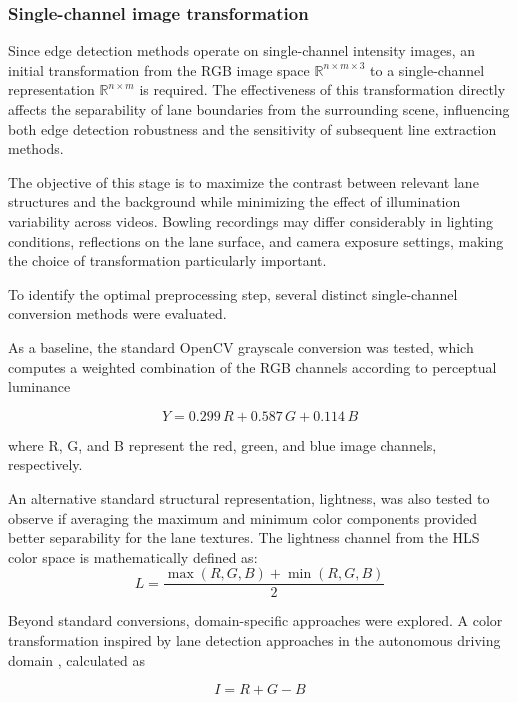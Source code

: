 \subsubsection{Single-channel image transformation}
Since edge detection methods operate on single-channel intensity images, an initial transformation from the RGB image space $\mathbb{R}^{n\times m\times 3}$ to a single-channel representation $\mathbb{R}^{n\times m}$ is required. The effectiveness of this transformation directly affects the separability of lane boundaries from the surrounding scene, influencing both edge detection robustness and the sensitivity of subsequent line extraction methods.

The objective of this stage is to maximize the contrast between relevant lane structures and the background while minimizing the effect of illumination variability across videos. Bowling recordings may differ considerably in lighting conditions, reflections on the lane surface, and camera exposure settings, making the choice of transformation particularly important.

To identify the optimal preprocessing step, several distinct single-channel conversion methods were evaluated.

As a baseline, the standard OpenCV grayscale conversion was tested, which computes a weighted combination of the RGB channels according to perceptual luminance \cite{opencv_color_conversion,gonzalez2008digital}  

\begin{equation}
Y = 0.299\,R + 0.587\,G + 0.114\,B
\end{equation}

where R, G, and B represent the red, green, and blue image channels, respectively.

An alternative standard structural representation, lightness, was also tested to observe if averaging the maximum and minimum color components provided better separability for the lane textures. The lightness channel from the HLS color space is mathematically defined as:
$$L = \frac{\max(R, G, B) + \min(R, G, B)}{2}$$

Beyond standard conversions, domain-specific approaches were explored. A color transformation inspired by lane detection approaches in the autonomous driving domain \cite{WU20142756}, calculated as

\begin{equation}
I = R + G - B
\end{equation}

